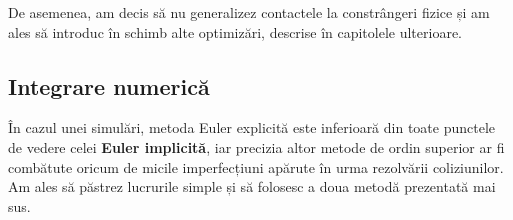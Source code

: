 \documentclass[12pt,a4paper]{report}
\newcommand{\worktype}[1]{[\textit{#1}] }
\newcommand{\dezvoltare}{\worktype{Dezvoltare de produs}}
\newcommand{\cercetare}{\worktype{Cercetare}}
\newcommand{\ambele}{\worktype{Ambele}}
\begin{document}
De asemenea, am decis să nu generalizez contactele la constrângeri fizice și am ales să introduc în schimb alte optimizări, descrise în capitolele ulterioare.

\subsection{Integrare numerică}

În cazul unei simulări, metoda Euler explicită este inferioară din toate punctele de vedere celei \textbf{Euler implicită}, iar precizia altor metode de ordin superior ar fi combătute oricum de micile imperfecțiuni apărute în urma rezolvării coliziunilor. Am ales să păstrez lucrurile simple și să folosesc a doua metodă prezentată mai sus.
% 
%
%
%
%
\end{document}

